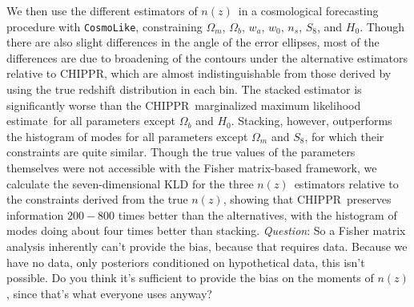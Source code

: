 \documentclass[iop]{emulateapj}
\newcommand{\todo}[3]{{\color{#2}\emph{#1}: #3}}
\newcommand{\aim}[1]{\todo{AIM}{red}{#1}}
\newcommand{\que}[1]{\todo{Question}{cyan}{#1}}
\newcommand{\project}[1]{\textsc{#1}}
\newcommand{\Chippr}{\project{CHIPPR}}%
\newcommand{\repo}[1]{\texttt{#1}}
\newcommand{\cosmolike}{\repo{CosmoLike}}
\newcommand{\nz}{$n(z)$}
\newcommand{\mmle}{marginalized maximum likelihood estimate}%
\begin{document}
We then use the different estimators of \nz\ in a cosmological forecasting procedure with \cosmolike, constraining $\Omega_{m}$, $\Omega_{b}$, $w_{a}$, $w_{0}$, $n_{s}$, $S_{8}$, and $H_{0}$.
Though there are also slight differences in the angle of the error ellipses, most of the differences are due to broadening of the contours under the alternative estimators relative to \Chippr, which are almost indistinguishable from those derived by using the true redshift distribution in each bin.
The stacked estimator is significantly worse than the \Chippr\ \mmle\ for all parameters except $\Omega_{b}$ and $H_{0}$.
Stacking, however, outperforms the histogram of modes for all parameters except $\Omega_{m}$ and $S_{8}$, for which their constraints are quite similar.
Though the true values of the parameters themselves were not accessible with the Fisher matrix-based framework, we calculate the seven-dimensional KLD for the three \nz\ estimators relative to the constraints derived from the true \nz, showing that \Chippr\ preserves information $200-800$ times better than the alternatives, with the histogram of modes doing about four times better than stacking.
\que{So a Fisher matrix analysis inherently can't provide the bias, because that requires data.
Because we have no data, only posteriors conditioned on hypothetical data, this isn't possible.
Do you think it's sufficient to provide the bias on the moments of \nz, since that's what everyone uses anyway?}
\end{document}
